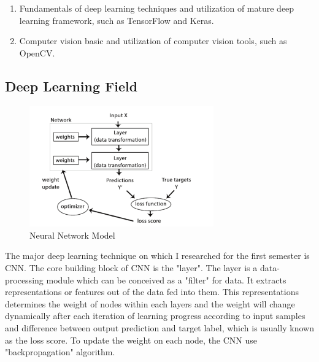 \documentclass[titlepage]{article}
\begin{document}
\begin{enumerate}
\item Fundamentals of deep learning techniques and utilization of mature deep
learning framework, such as TensorFlow and Keras.
\item Computer vision basic and utilization of computer vision tools, such as
OpenCV.
\end{enumerate}

\subsection{Deep Learning Field}
\label{sec:orgce6a2e2}
\begin{figure}[htbp]
\centering
\includegraphics[width=300]{cnn_model.PNG}
\caption{Neural Network Model}
\end{figure}
\newpage

The major deep learning technique on which I researched for the first
semester is CNN. The core building block of CNN is the "layer". The layer is
a data-processing module which can be conceived as a "filter" for data. It
extracts representations or features out of the data fed into them. This
representations determines the weight of nodes within each layers and the
weight will change dynamically after each iteration of learning progress
according to input samples and difference between output prediction and
target label, which is usually known as the loss score. To update the weight
on each node, the CNN use "backpropagation" algorithm.
\end{document}
